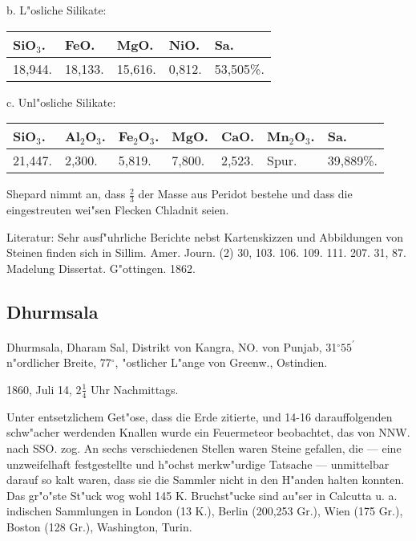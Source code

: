 \documentclass[a4paper, 11pt, oneside]{article}
\begin{document}
\begin{center}
b. L"osliche Silikate:
\end{center}

\begin{table}[H]
    \centering
    \begin{tabular}{l l l l l}
        SiO$_{3}$. & FeO. & MgO. & NiO. & Sa. \\ \hline
        18,944. & 18,133. & 15,616. & 0,812. & 53,505\%. \\
    \end{tabular}
\end{table}

\begin{center}
c. Unl"osliche Silikate:
\end{center}

\begin{table}[H]
    \centering
    \begin{tabular}{l l l l l l l}
        SiO$_{3}$. & Al$_{2}$O$_{3}$. & Fe$_{2}$O$_{3}$. & MgO. & CaO. & Mn$_{2}$O$_{3}$. & Sa. \\ \hline
        21,447. & 2,300. & 5,819. & 7,800. & 2,523. & Spur. & 39,889\%. \\
    \end{tabular}
\end{table}

Shepard nimmt an, dass $\frac{2}{3}$ der Masse aus Peridot bestehe und dass die eingestreuten wei"sen Flecken Chladnit seien.

\footnotesize
Literatur: Sehr ausf"uhrliche Berichte nebst Kartenskizzen und Abbildungen von Steinen finden sich in Sillim. Amer. Journ. (2) 30, 103. 106. 109. 111. 207. 31, 87. Madelung Dissertat. G"ottingen. 1862.

\subsection{Dhurmsala}
\normalsize
\paragraph{}
Dhurmsala, Dharam Sal, Distrikt von Kangra, NO. von Punjab, 31$^\circ 55^\prime$ n"ordlicher Breite, 77$^\circ$, "ostlicher L"ange von Greenw., Ostindien.

1860, Juli 14, $2\frac{1}{4}$ Uhr Nachmittags.

Unter entsetzlichem Get"ose, dass die Erde zitierte, und 14-16 darauffolgenden schw"acher werdenden Knallen wurde ein Feuermeteor beobachtet, das von NNW. nach SSO. zog. An sechs verschiedenen Stellen waren Steine gefallen, die --- eine unzweifelhaft festgestellte und h"ochst merkw"urdige Tatsache --- unmittelbar darauf so kalt waren, dass sie die Sammler nicht in den H"anden halten konnten. Das gr"o"ste St"uck wog wohl 145 K. Bruchst"ucke sind au"ser in Calcutta u. a. indischen Sammlungen in London (13 K.), Berlin (200,253 Gr.), Wien (175 Gr.), Boston (128 Gr.), Washington, Turin.
\end{document}

